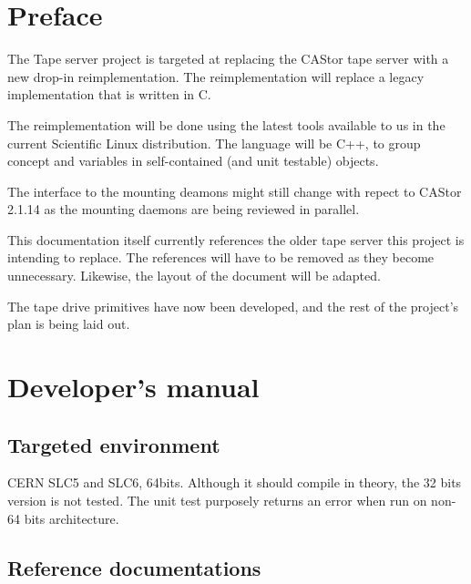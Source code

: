 \chapter*{Preface}

The Tape server project is targeted at replacing the CAStor tape server with a new drop-{}in reimplementation. The reimplementation will replace a legacy implementation that is written in C.

The reimplementation will be done using the latest tools available to us in the current Scientific Linux distribution. The language will be C++, to group concept and variables in self-contained
(and unit testable) objects.

The interface to the mounting deamons might still change with repect to CAStor 2.1.14 as the mounting daemons are being reviewed in parallel.

This documentation itself currently references the older tape server this project is intending to replace. The references will have to be removed as they become unnecessary. 
Likewise, the layout of the document will be adapted.

The tape drive primitives have now been developed, and the rest of the project's
plan is being laid out.


\chapter{Developer's manual}


\section{Targeted environment}

CERN SLC5 and SLC6, 64bits. Although it should compile in theory, the 32 bits version is not tested. The unit test purposely returns an error when run on non-64 bits architecture.



\section{Reference documentations}
